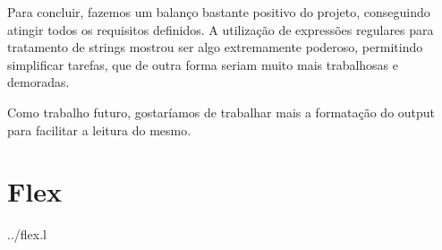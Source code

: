 \documentclass[a4paper]{report}
\begin{document}
Para concluir, fazemos um balanço bastante positivo do projeto, conseguindo
atingir todos os requisitos definidos. A utilização de expressões regulares
para tratamento de strings mostrou ser algo extremamente poderoso, permitindo
simplificar tarefas, que de outra forma seriam muito mais trabalhosas e demoradas.

Como trabalho futuro, gostaríamos de trabalhar mais a formatação do output
para facilitar a leitura do mesmo.

\appendix

\chapter{Flex}


{../flex.l}
\end{document}
